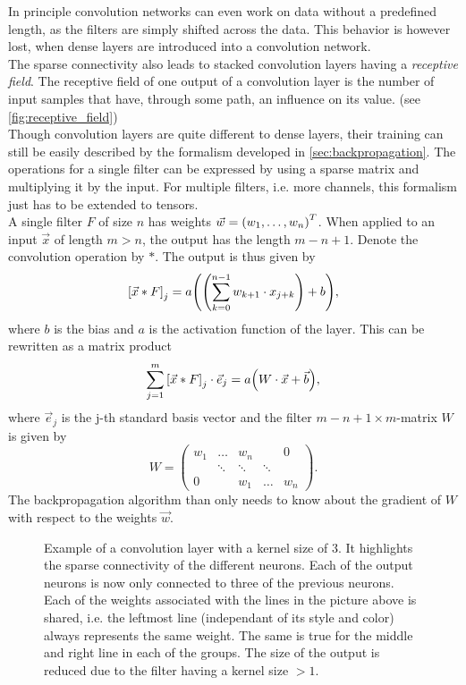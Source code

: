 In principle convolution networks can even work on data without a predefined length, as the filters are simply shifted across the data. This behavior is however lost, when dense layers are introduced into a convolution network.\medskip\\
The sparse connectivity also leads to stacked convolution layers having a \emph{receptive field}. The receptive field of one output of a convolution layer is the number of input samples that have, through some path, an influence on its value. (see \autoref{fig:receptive_field})\medskip\\
Though convolution layers are quite different to dense layers, their training can still be easily described by the formalism developed in \autoref{sec:backpropagation}. The operations for a single filter can be expressed by using a sparse matrix and multiplying it by the input. For multiple filters, i.e. more channels, this formalism just has to be extended to tensors.\\
A single filter $F$ of size $n$ has weights $\vec{w} = {\left( w_1, \dotsc, w_n \right)}^T$. When applied to an input $\vec{x}$ of length $m>n$, the output has the length $m - n + 1$. Denote the convolution operation by $\ast$. The output is thus given by
\begin{equation}
{\left[\vec{x}\ast F\right]}_j = a{\left( {\left( \sum_{k=0}^{n-1} w_{k+1}\cdot x_{j+k} \right)}+b \right)},
\end{equation}
where $b$ is the bias and $a$ is the activation function of the layer. This can be rewritten as a matrix product
\begin{equation}
\sum_{j=1}^m {\left[\vec{x}\ast F\right]}_j \cdot\vec{e}_j = a{\left( W\cdot \vec{x}+\vec{b} \right)},
\end{equation}
where $\vec{e}_j$ is the j-th standard basis vector and the filter $m-n+1\times m$-matrix $W$ is given by
\begin{equation}
W =
\begin{pmatrix}
	w_1 & \dots & w_n & {} & 0 \\
	{} & \ddots & \ddots & \ddots & {}\\
	0 & {} & w_1 & \dots & w_n
\end{pmatrix}.
\end{equation}
The backpropagation algorithm than only needs to know about the gradient of $W$ with respect to the weights $\vec{w}$.
\begin{figure}
\centering

\caption[Convolution 1D]{Example of a convolution layer with a kernel size of $3$. It highlights the sparse connectivity of the different neurons. Each of the output neurons is now only connected to three of the previous neurons. Each of the weights associated with the lines in the picture above is shared, i.e. the leftmost line (independant of its style and color) always represents the same weight. The same is true for the middle and right line in each of the groups. The size of the output is reduced due to the filter having a kernel size $>1$.}\label{fig:simple_convolution}
\end{figure}
